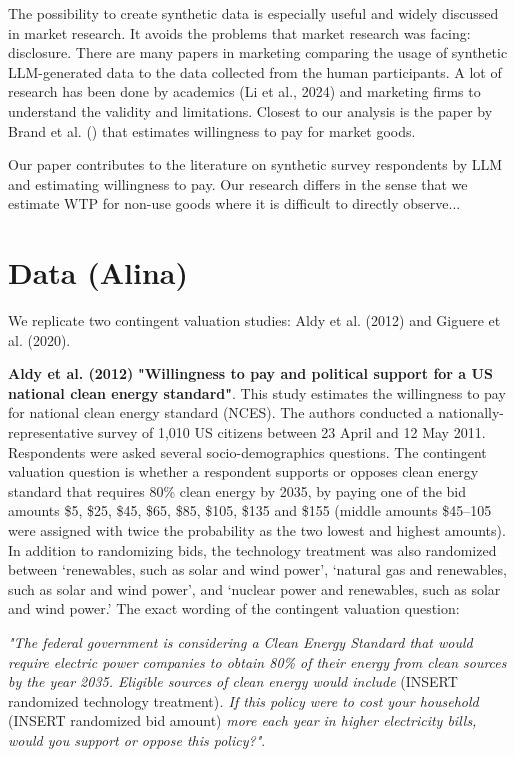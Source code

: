 \documentclass[12pt]{article}
\begin{document}
The possibility to create synthetic data is especially useful  and widely discussed in market research.  It avoids the problems that market research was facing: disclosure. There are many papers in marketing comparing the usage of synthetic LLM-generated data to the data collected from the human participants. A lot of research has been done by academics (Li et al., 2024) and marketing firms to understand the validity and limitations. Closest to our analysis is the paper by Brand et al. () that estimates willingness to pay for market goods.

Our paper contributes to the literature on synthetic survey respondents by LLM and estimating willingness to pay. Our research differs in the sense that we estimate WTP for non-use goods where it is difficult to directly observe...

\section{Data (Alina)}

We replicate two contingent valuation studies: Aldy et al. (2012) and Giguere et al. (2020). 

\textbf{Aldy et al. (2012)}\textbf{ "Willingness to pay and political support for a US national clean energy standard"}. This study estimates the willingness to pay for national clean energy standard (NCES). The authors conducted a nationally-representative survey of 1,010 US citizens between 23 April and 12 May 2011. Respondents were asked several socio-demographics questions. The contingent valuation question is whether a respondent supports or opposes clean energy standard that requires 80\% clean energy by 2035, by paying one of the bid amounts \$5, \$25, \$45, \$65, \$85, \$105, \$135 and \$155 (middle amounts \$45–105 were assigned with twice the probability as the two lowest and highest amounts). In addition to randomizing bids, the technology treatment was also randomized between ‘renewables, such as solar and wind power’, ‘natural gas and renewables, such as solar and wind power’, and ‘nuclear power and renewables, such as solar and wind power.’ The exact wording of the contingent valuation question:

\textit{"The federal government is considering a Clean Energy Standard that would require electric power companies to obtain 80\% of their energy from clean sources by the year 2035. Eligible sources of clean energy would include }(INSERT randomized technology treatment)\textit{. If this policy were to cost your household }(INSERT randomized bid amount)\textit{ more each year in higher electricity bills, would you support or oppose this policy?"}. 
\end{document}
